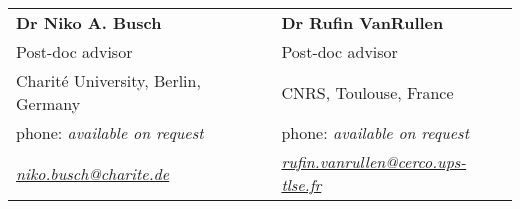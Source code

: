 \documentclass[margin,line]{resume}
\begin{document}
\begin{resume}
	\begin{tabular}{@{}p{6cm}p{6cm}}
	\textbf{Dr Niko A. Busch}       &  \textbf{Dr Rufin VanRullen}                   \\
	Post-doc advisor                   &  Post-doc advisor                       \\
	Charité University, Berlin, Germany         &  CNRS, Toulouse, France        \\
	phone: \textsl{available on request}    &  phone: \textsl{available on request}     \\
	\textsl{\href{mailto:niko.busch@charite.de}{niko.busch@charite.de}}  &  
	\textsl{\href{mailto:rufin.vanrullen@cerco.ups-tlse.fr}{rufin.vanrullen@cerco.ups-tlse.fr}}    \\
	\end{tabular}


\end{resume}
\end{document}
